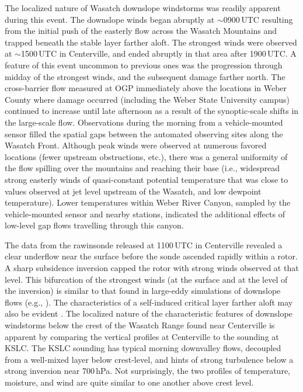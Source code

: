 \documentclass[pdftex,12pt]{article}
\def\around{$\sim$}
\begin{document}
The localized nature of Wasatch downslope windstorms was readily apparent during this event. The downslope winds began abruptly at \around 0900\,UTC resulting from the initial push of the easterly flow across the Wasatch Mountains and trapped beneath the stable layer farther aloft. The strongest winds were observed at \around 1500\,UTC in Centerville, and ended abruptly in that area after 1900\,UTC. A feature of this event uncommon to previous ones was the progression through midday of the strongest winds, and the subsequent damage farther north. The cross-barrier flow measured at OGP immediately above the locations in Weber County where damage occurred (including the Weber State University campus) continued to increase until late afternoon as a result of the synoptic-scale shifts in the large-scale flow. Observations during the morning from a vehicle-mounted sensor filled the spatial gaps between the automated observing sites along the Wasatch Front. Although peak winds were observed at numerous favored locations (fewer upstream obstructions, etc.), there was a general uniformity of the flow spilling over the mountains and reaching their base (i.e., widespread strong easterly winds of quasi-constant potential temperature that was close to values observed at jet level upstream of the Wasatch, and low dewpoint temperature). Lower temperatures within Weber River Canyon, sampled by the vehicle-mounted sensor and nearby stations, indicated the additional effects of low-level gap flows travelling through this canyon.


The data from the rawinsonde released at 1100\,UTC in Centerville revealed a clear underflow near the surface \citep{Armi2011} before the sonde ascended rapidly within a rotor. A sharp subsidence inversion capped the rotor with strong winds observed at that level. This bifurcation of the strongest winds (at the surface and at the level of the inversion) is similar to that found in large-eddy simulations of downslope flows (e.g., \citealt{Hertenstein2009}). The characteristics of a self-induced critical layer farther aloft may also be evident \citep{Peltier1979}. The localized nature of the characteristic features of downslope windstorms below the crest of the Wasatch Range found near Centerville is apparent by comparing the vertical profiles at Centerville to the sounding at KSLC. The KSLC sounding has typical morning downvalley flows, decoupled from a well-mixed layer below crest-level, and hints of strong turbulence below a strong inversion near 700\,hPa. Not surprisingly, the two profiles of temperature, moisture, and wind are quite similar to one another above crest level.
\end{document}
